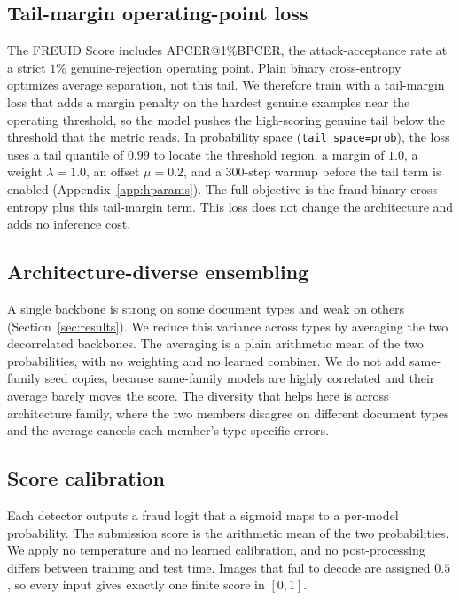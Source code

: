 \documentclass[11pt,a4paper]{article}
\begin{document}
\subsection{Tail-margin operating-point loss}
\label{sec:loss}
The FREUID Score includes APCER@1\%BPCER, the attack-acceptance rate at a strict $1\%$ genuine-rejection
operating point. Plain binary cross-entropy optimizes average separation, not this tail. We therefore train
with a tail-margin loss that adds a margin penalty on the hardest genuine examples near the operating
threshold, so the model pushes the high-scoring genuine tail below the threshold that the metric reads. In
probability space (\texttt{tail\_space=prob}), the loss uses a tail quantile of $0.99$ to locate the
threshold region, a margin of $1.0$, a weight $\lambda=1.0$, an offset $\mu=0.2$, and a $300$-step warmup
before the tail term is enabled (Appendix~\ref{app:hparams}). The full objective is the fraud binary
cross-entropy plus this tail-margin term. This loss does not change the architecture and adds no inference
cost.

\subsection{Architecture-diverse ensembling}
\label{sec:diversity}
A single backbone is strong on some document types and weak on others (Section~\ref{sec:results}). We reduce
this variance across types by averaging the two decorrelated backbones. The averaging is a plain arithmetic
mean of the two probabilities, with no weighting and no learned combiner. We do not add same-family seed
copies, because same-family models are highly correlated and their average barely moves the score. The
diversity that helps here is across architecture family, where the two members disagree on different document
types and the average cancels each member's type-specific errors.

\subsection{Score calibration}
\label{sec:calib}
Each detector outputs a fraud logit that a sigmoid maps to a per-model probability. The submission score is
the arithmetic mean of the two probabilities. We apply no temperature and no learned calibration, and no
post-processing differs between training and test time. Images that fail to decode are assigned $0.5$, so
every input gives exactly one finite score in $[0,1]$.
\end{document}
